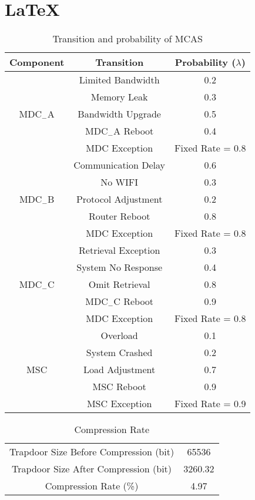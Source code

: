 \documentclass[paper=a4, fontsize=11pt]{scrartcl} %
\numberwithin{equation}{section} %
\numberwithin{figure}{section} %
\numberwithin{table}{section} %
\begin{document}
	
\section{\LaTeX}
	\begin{table}[H]
		\begin{center}
			\begin{tabular}{c |c |c}
				\hline
				Component & Transition & Probability ($\lambda$)\\
				\hline
				\multirow{5}{*}{MDC$_{-}$A} & Limited Bandwidth &0.2\\
				& Memory Leak & 0.3\\
				&Bandwidth Upgrade & 0.5 \\
				& MDC$_{-}$A Reboot &0.4\\
				&MDC Exception & Fixed Rate = 0.8 \\
				\hline
				\multirow{5}{*}{MDC$_{-}$B}& Communication Delay & 0.6\\
				& No WIFI & 0.3\\
				&Protocol Adjustment & 0.2 \\
				& Router Reboot & 0.8  \\
				&MDC Exception & Fixed Rate = 0.8 \\
				\hline
				\multirow{5}{*}{MDC$_{-}$C} & Retrieval Exception &0.3\\
				& System No Response & 0.4 \\
				&Omit Retrieval & 0.8  \\
				& MDC$_{-}$C Reboot & 0.9\\
				&MDC Exception & Fixed Rate = 0.8 \\
				\hline
				\multirow{5}{*}{MSC} & Overload & 0.1\\
				& System Crashed & 0.2 \\
				& Load Adjustment& 0.7 \\
				& MSC  Reboot & 0.9\\
				&MSC Exception& Fixed Rate = 0.9 \\
				\hline
			\end{tabular}
		\end{center}
		\caption{ Transition and probability of MCAS}
	\end{table}
	
	\begin{table}
		\begin{center}
			\begin{tabular}{ c c}
				\hline
				Trapdoor Size Before Compression (bit) & 65536 \\
				Trapdoor Size After Compression (bit) &3260.32 \\
				Compression Rate (\%) & 4.97 \\
				\hline
			\end{tabular}
		\end{center}
		\caption{Compression Rate}
	\end{table}
	
\end{document}
